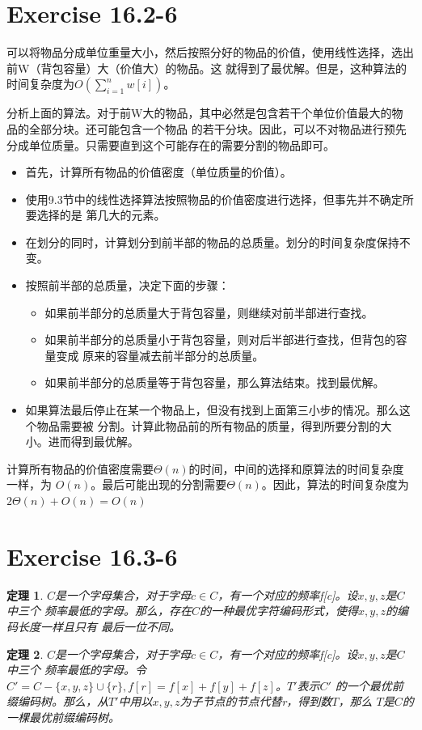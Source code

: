 \documentclass[a4paper, 11pt]{article}
\theoremstyle{plain}\newtheorem{Lemma}{定理}
\begin{document}
\section{Exercise 16.2-6}

可以将物品分成单位重量大小，然后按照分好的物品的价值，使用线性选择，选出前W（背包容量）大（价值大）的物品。这
就得到了最优解。但是，这种算法的时间复杂度为$O(\sum_{i=1}^{n}{w[i]})$。

分析上面的算法。对于前W大的物品，其中必然是包含若干个单位价值最大的物品的全部分块。还可能包含一个物品
的若干分块。因此，可以不对物品进行预先分成单位质量。只需要直到这个可能存在的需要分割的物品即可。

\begin{itemize}
	\item 首先，计算所有物品的价值密度（单位质量的价值）。
	\item 使用9.3节中的线性选择算法按照物品的价值密度进行选择，但事先并不确定所要选择的是
		第几大的元素。
	\item 在划分的同时，计算划分到前半部的物品的总质量。划分的时间复杂度保持不变。
	\item 按照前半部的总质量，决定下面的步骤：
	\begin{itemize}
		\item 如果前半部分的总质量大于背包容量，则继续对前半部进行查找。
		\item 如果前半部分的总质量小于背包容量，则对后半部进行查找，但背包的容量变成
			原来的容量减去前半部分的总质量。
		\item 如果前半部分的总质量等于背包容量，那么算法结束。找到最优解。
	\end{itemize}
	\item 如果算法最后停止在某一个物品上，但没有找到上面第三小步的情况。那么这个物品需要被
		分割。计算此物品前的所有物品的质量，得到所要分割的大小。进而得到最优解。
\end{itemize}

	计算所有物品的价值密度需要$\Theta(n)$的时间，中间的选择和原算法的时间复杂度一样，为
$O(n)$。最后可能出现的分割需要$\Theta(n)$。因此，算法的时间复杂度为$2\Theta(n)+O(n)=O(n)$


\section{Exercise 16.3-6}
	\begin{Lemma}\label{L1}
	$C$是一个字母集合，对于字母$c \in C$，有一个对应的频率f[c]。设$x,y,z$是$C$中三个
	频率最低的字母。那么，存在$C$的一种最优字符编码形式，使得$x,y,z$的编码长度一样且只有
	最后一位不同。
	\end{Lemma}
	\begin{Lemma}\label{L2}
	$C$是一个字母集合，对于字母$c \in C$，有一个对应的频率f[c]。设$x,y,z$是$C$中三个
	频率最低的字母。令$C'=C-\{x,y,z\}\cup\{r\}, f[r]=f[x]+f[y]+f[z]$。$T'$表示$C'$
	的一个最优前缀编码树。那么，从$T'$中用以$x,y,z$为子节点的节点代替r，得到数$T$，那么
	$T$是$C$的一棵最优前缀编码树。
	\end{Lemma}
	
\end{document}
